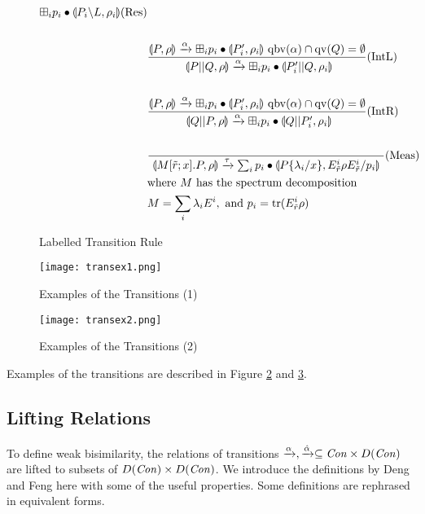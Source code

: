 \begin{figure}
\begin{align*}
{ \boxplus_i p_i \bullet \llparenthesis P_i \backslash L, \rho_i \rrparenthesis }(\mbox{Res})
\\
\\
&\frac{
\llparenthesis P, \rho \rrparenthesis \xrightarrow{\alpha}
\boxplus_i p_i \bullet\llparenthesis P'_i, \rho_i \rrparenthesis~\mathrm{qbv}(\alpha) \cap
 \mathrm{qv}(Q) = \emptyset
}
{
~\llparenthesis P||Q, \rho \rrparenthesis \xrightarrow{\alpha}
\boxplus_i p_i \bullet\llparenthesis P'_i||Q, \rho_i \rrparenthesis
}(\mbox{IntL})\\
\\
&\frac{
\llparenthesis P, \rho \rrparenthesis \xrightarrow{\alpha}
\boxplus_i p_i \bullet\llparenthesis P'_i, \rho_i \rrparenthesis~\mathrm{qbv}(\alpha) \cap
 \mathrm{qv}(Q) = \emptyset
}
{
~\llparenthesis Q||P, \rho \rrparenthesis \xrightarrow{\alpha}
\boxplus_i p_i \bullet\llparenthesis Q||P'_i, \rho_i \rrparenthesis
}(\mbox{IntR})\\
\\
&\frac{
}
{
~\llparenthesis M[\tilde r;x].P, \rho \rrparenthesis \xrightarrow{\tau}
 \sum_i p_i \bullet \llparenthesis P\{\lambda_i/x\}, E^i_{\tilde r} \rho E^i_{\tilde r}/p_i \rrparenthesis~
}(\mbox{Meas})\\
&\mbox{where }M\mbox{ has the spectrum decomposition}\\
&M = \sum_i \lambda_i E^i,~{\rm and}
~p_i = \mathrm{tr}(E^i_{\tilde r}\rho)
\end{align*}
\caption{Labelled Transition Rule}
\label{fig:qccs-ltr}
\end{figure}

\begin{figure}[htbp]
 \begin{center}
  \texttt{[image: transex1.png]}
 \end{center}
 \caption{Examples of the Transitions (1)}
 \label{fig:transex1}
\end{figure}
\begin{figure}[htbp]
 \begin{center}
  \texttt{[image: transex2.png]}
 \end{center}
 \caption{Examples of the Transitions (2)}
 \label{fig:transex2}
\end{figure}

\begin{ex} Examples of the transitions are described in Figure
 \ref{fig:transex1} and \ref{fig:transex2}.
\end{ex}

\subsection{Lifting Relations}
To define weak
bisimilarity, the relations of transitions $\xrightarrow{\alpha},
\xrightarrow{\hat \alpha}
\subseteq \mathit{Con} \times D(\mathit{Con})$ are lifted to subsets of $D(\mathit{Con})
\times
D(\mathit{Con})$. We introduce the definitions by
Deng and Feng \cite{DengFeng2012} here with some of the useful
properties.
Some definitions are rephrased in equivalent forms.

